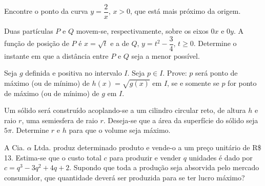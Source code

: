 \begin{exercicio}[14]
Encontre o ponto da curva $y = \dfrac{2}{x}$, $x > 0$, que está mais próximo da origem.
\end{exercicio}

\begin{exercicio}[15]
Duas partículas $P$ e $Q$ movem-se, respectivamente, sobre os eixos $0x$ e $0y$. A função de posição de $P$ é $x = \sqrt{t}$ e a de $Q$, $y = t^2 - \dfrac{3}{4}$, $t \ge 0$. Determine o instante em que a distância entre $P$ e $Q$ seja a menor possível.
\end{exercicio}

\begin{exercicio}[16]
Seja $g$ definida e positiva no intervalo $I$. Seja $p \in I$. Prove: $p$ será ponto de máximo (ou de mínimo) de $h(x) = \sqrt{g(x)}$ em $I$, se e somente se $p$ for ponto de máximo (ou de mínimo) de $g$ em $I$.
\end{exercicio}

\begin{exercicio}[17]
Um sólido será construído acoplando-se a um cilindro circular reto, de altura $h$ e raio $r$, uma semiesfera de raio $r$. Deseja-se que a área da superfície do sólido seja $5\pi$. Determine $r$ e $h$ para que o volume seja máximo.

\begin{center}
\end{center}
\end{exercicio}

\begin{exercicio}[18]
A Cia. $\alpha$ Ltda. produz determinado produto e vende-o a um preço unitário de R\$ 13. Estima-se que o custo total $c$ para produzir e vender $q$ unidades é dado por $c = q^3 - 3q^2 + 4q + 2$. Supondo que toda a produção seja absorvida pelo mercado consumidor, que quantidade deverá ser produzida para se ter lucro máximo?
\end{exercicio}

